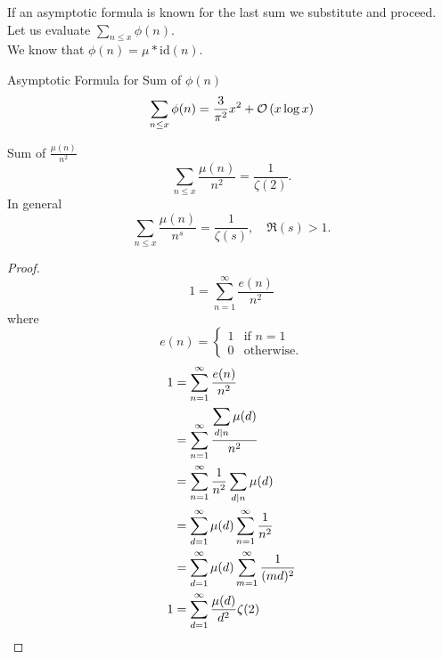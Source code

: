 \documentclass[twoside, openright, fontsize=10pt, headings=big]{scrbook}
\begin{document}
If an asymptotic formula is known for the last sum we substitute and proceed.\\
Let us evaluate $\sum_{n\leq x}\phi(n)$.\\
We know that $\phi(n)=\mu\ast\mathrm{id}(n)$.
\begin{theorem}{Asymptotic Formula for Sum of $\phi(n)$}{}
    \[
        \sum_{n\leq x}\phi(n)=\frac{3}{\pi^2}x^2+\mathcal{O}\left(x\log x\right)
    \]
\end{theorem}
\begin{lemma}{Sum of $\frac{\mu(n)}{n^2}$}{}
    \[
        \sum_{n\leq x}\frac{\mu(n)}{n^2}=\frac{1}{\zeta(2)}.
    \]
    In general
    \[
        \sum_{n\leq x}\frac{\mu(n)}{n^s}=\frac{1}{\zeta(s)},\quad \Re(s)>1.
    \]
\end{lemma}
\begin{proof}
    \[
        1=\sum_{n=1}^{\infty}\frac{e(n)}{n^2}
    \]
    where 
    \[
        e(n)=
        \begin{cases}
            1&\text{if }n=1\\
            0&\text{otherwise}.    
        \end{cases}
    \]
    \begin{align*}
        1&=\sum_{n=1}^{\infty}\frac{e(n)}{n^2}\\
        &=\sum_{n=1}^{\infty}\frac{\displaystyle\sum_{d\mid n}\mu(d)}{n^2}\\
        &=\sum_{n=1}^{\infty}\frac{1}{n^2}\sum_{d\mid n}\mu(d)\\
        &=\sum_{d=1}^\infty\mu(d)\sum_{n=1}^{\infty}\frac{1}{n^2}\\
        &=\sum_{d=1}^\infty\mu(d)\sum_{m=1}^{\infty}\frac{1}{(md)^2}\\
        1&=\sum_{d=1}^\infty\frac{\mu(d)}{d^2}\zeta(2)\qedhere
    \end{align*}
\end{proof}
\end{document}
